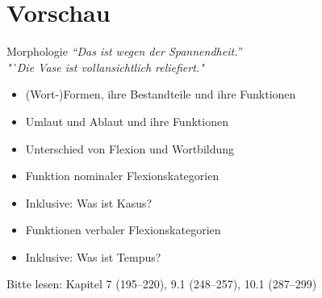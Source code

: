 \section{Vorschau}

\begin{frame}
  {Morphologie}
  \pause
  \textit{"`Das ist wegen der Spannendheit."'}\\
  \pause
  \textit{"`Die Vase ist vollansichtlich reliefiert."}\\
  \Zeile
  \pause
  \begin{itemize}[<+->]
    \item (Wort-)Formen, ihre Bestandteile und ihre Funktionen
    \item Umlaut und Ablaut und ihre Funktionen
    \item Unterschied von Flexion und Wortbildung
      \Zeile
    \item Funktion nominaler Flexionskategorien
    \item {} \alert{Inklusive: Was ist Kasus?}
    \item Funktionen verbaler Flexionskategorien
    \item {} \alert{Inklusive: Was ist Tempus?}
  \end{itemize}
  \pause
  \Zeile
  \centering
  Bitte lesen: \alert{Kapitel 7 (195--220), 9.1 (248--257), 10.1 (287--299)}

  \pause
  \pause
  \pause
  \pause
  \pause
\end{frame}

